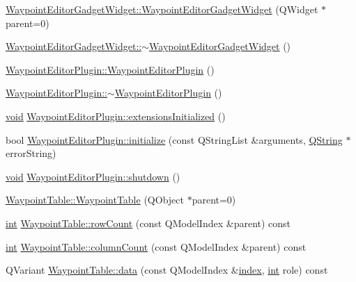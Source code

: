 \begin{DoxyCompactItemize}
\item 
\hyperlink{group___waypoint_editor_gadget_plugin_gaed1892bdb06fd69b9efd71f0490b6865}{Waypoint\-Editor\-Gadget\-Widget\-::\-Waypoint\-Editor\-Gadget\-Widget} (Q\-Widget $\ast$parent=0)
\item 
\hyperlink{group___waypoint_editor_gadget_plugin_ga6384204fc4ea3baac3ef034bec3ffd2e}{Waypoint\-Editor\-Gadget\-Widget\-::$\sim$\-Waypoint\-Editor\-Gadget\-Widget} ()
\item 
\hyperlink{group___waypoint_editor_gadget_plugin_gab79d5211378f7e8d1c28ac11e4a2be91}{Waypoint\-Editor\-Plugin\-::\-Waypoint\-Editor\-Plugin} ()
\item 
\hyperlink{group___waypoint_editor_gadget_plugin_gada6348846ef5c9b1a2778bd9ed769857}{Waypoint\-Editor\-Plugin\-::$\sim$\-Waypoint\-Editor\-Plugin} ()
\item 
\hyperlink{group___u_a_v_objects_plugin_ga444cf2ff3f0ecbe028adce838d373f5c}{void} \hyperlink{group___waypoint_editor_gadget_plugin_ga2df66419e41be573431fc273f596cc71}{Waypoint\-Editor\-Plugin\-::extensions\-Initialized} ()
\item 
bool \hyperlink{group___waypoint_editor_gadget_plugin_gaaea9c5cb6306b4ee7b48412c09660111}{Waypoint\-Editor\-Plugin\-::initialize} (const Q\-String\-List \&arguments, \hyperlink{group___u_a_v_objects_plugin_gab9d252f49c333c94a72f97ce3105a32d}{Q\-String} $\ast$error\-String)
\item 
\hyperlink{group___u_a_v_objects_plugin_ga444cf2ff3f0ecbe028adce838d373f5c}{void} \hyperlink{group___waypoint_editor_gadget_plugin_ga4fdf75a1aea39e6e89f5fe83b8b812f9}{Waypoint\-Editor\-Plugin\-::shutdown} ()
\item 
\hyperlink{group___waypoint_editor_gadget_plugin_ga62b0d5f07aaa7e091ea9b812437936a3}{Waypoint\-Table\-::\-Waypoint\-Table} (Q\-Object $\ast$parent=0)
\item 
\hyperlink{ioapi_8h_a787fa3cf048117ba7123753c1e74fcd6}{int} \hyperlink{group___waypoint_editor_gadget_plugin_ga0e60d1faba432ebe1d1e8de7c8cf02bf}{Waypoint\-Table\-::row\-Count} (const Q\-Model\-Index \&parent) const 
\item 
\hyperlink{ioapi_8h_a787fa3cf048117ba7123753c1e74fcd6}{int} \hyperlink{group___waypoint_editor_gadget_plugin_gac82408f059700c3a127f3d9a2f870d27}{Waypoint\-Table\-::column\-Count} (const Q\-Model\-Index \&parent) const 
\item 
Q\-Variant \hyperlink{group___waypoint_editor_gadget_plugin_ga983933a1c8fe4e9e8489d7b0f2b78461}{Waypoint\-Table\-::data} (const Q\-Model\-Index \&\hyperlink{glext_8h_ab47dd9958bcadea08866b42bf358e95e}{index}, \hyperlink{ioapi_8h_a787fa3cf048117ba7123753c1e74fcd6}{int} role) const 

\end{DoxyCompactItemize}
